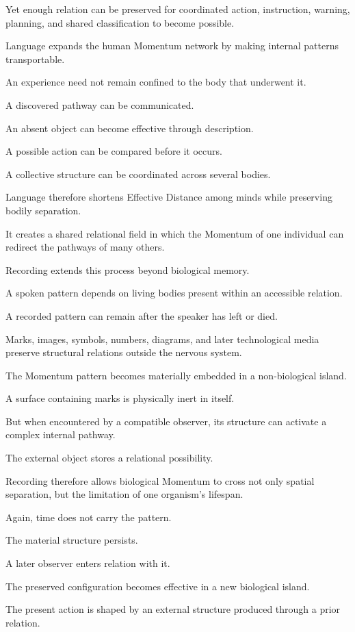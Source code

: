 Yet enough relation can be preserved for coordinated action, instruction, warning, planning, and shared classification to become possible.

Language expands the human Momentum network by making internal patterns transportable.

An experience need not remain confined to the body that underwent it.

A discovered pathway can be communicated.

An absent object can become effective through description.

A possible action can be compared before it occurs.

A collective structure can be coordinated across several bodies.

Language therefore shortens Effective Distance among minds while preserving bodily separation.

It creates a shared relational field in which the Momentum of one individual can redirect the pathways of many others.

Recording extends this process beyond biological memory.

A spoken pattern depends on living bodies present within an accessible relation.

A recorded pattern can remain after the speaker has left or died.

Marks, images, symbols, numbers, diagrams, and later technological media preserve structural relations outside the nervous system.

The Momentum pattern becomes materially embedded in a non-biological island.

A surface containing marks is physically inert in itself.

But when encountered by a compatible observer, its structure can activate a complex internal pathway.

The external object stores a relational possibility.

Recording therefore allows biological Momentum to cross not only spatial separation, but the limitation of one organism’s lifespan.

Again, time does not carry the pattern.

The material structure persists.

A later observer enters relation with it.

The preserved configuration becomes effective in a new biological island.

The present action is shaped by an external structure produced through a prior relation.

